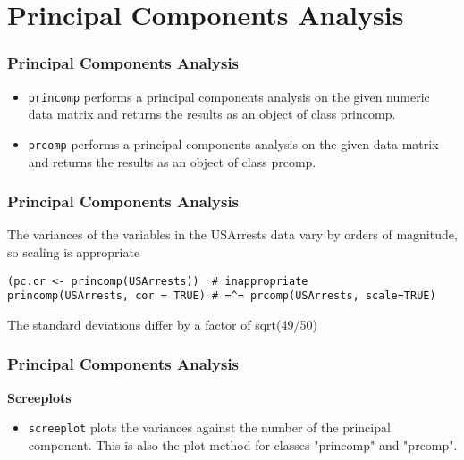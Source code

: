 


% 

\section*{Principal Components Analysis}
\begin{frame}[fragile]
\frametitle{Principal Components Analysis}

\begin{itemize}

\item \texttt{princomp} performs a principal 
components analysis on the given numeric data 
matrix and returns the results as an object of 
class princomp.

\item \texttt{prcomp} performs a principal 
components analysis on the given data matrix and returns the results as an object of class prcomp.

\end{itemize}

\end{frame}
\begin{frame}[fragile]
\frametitle{Principal Components Analysis}

The variances of the variables in the
USArrests data vary by orders of magnitude, so scaling is appropriate

\begin{framed}
\begin{verbatim}
(pc.cr <- princomp(USArrests))  # inappropriate
princomp(USArrests, cor = TRUE) # =^= prcomp(USArrests, scale=TRUE)

\end{verbatim}
\end{framed}

The standard deviations differ by a factor of sqrt(49/50)
\end{frame}

\begin{frame}[fragile]
\frametitle{Principal Components Analysis}


\textbf{Screeplots}

\begin{itemize}

\item \texttt{screeplot} plots the variances against the number of the principal component. This is also the plot method for classes "princomp" and "prcomp".
\end{itemize}

\end{frame}
